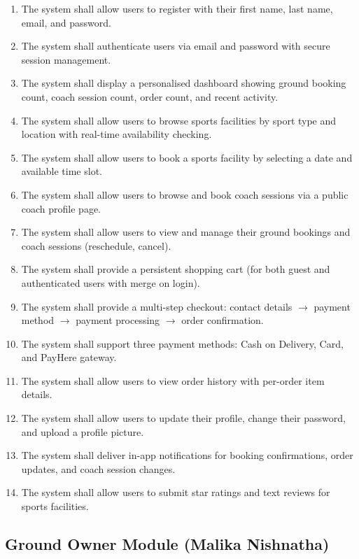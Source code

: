 \documentclass[12pt,a4paper]{report}
\begin{document}
\begin{enumerate}[leftmargin=1.5cm]
  \item The system shall allow users to register with their first name, last name, email, and password.
  \item The system shall authenticate users via email and password with secure session management.
  \item The system shall display a personalised dashboard showing ground booking count, coach session count, order count, and recent activity.
  \item The system shall allow users to browse sports facilities by sport type and location with real-time availability checking.
  \item The system shall allow users to book a sports facility by selecting a date and available time slot.
  \item The system shall allow users to browse and book coach sessions via a public coach profile page.
  \item The system shall allow users to view and manage their ground bookings and coach sessions (reschedule, cancel).
  \item The system shall provide a persistent shopping cart (for both guest and authenticated users with merge on login).
  \item The system shall provide a multi-step checkout: contact details $\to$ payment method $\to$ payment processing $\to$ order confirmation.
  \item The system shall support three payment methods: Cash on Delivery, Card, and PayHere gateway.
  \item The system shall allow users to view order history with per-order item details.
  \item The system shall allow users to update their profile, change their password, and upload a profile picture.
  \item The system shall deliver in-app notifications for booking confirmations, order updates, and coach session changes.
  \item The system shall allow users to submit star ratings and text reviews for sports facilities.
\end{enumerate}

\subsection{Ground Owner Module (Malika Nishnatha)}
\end{document}
